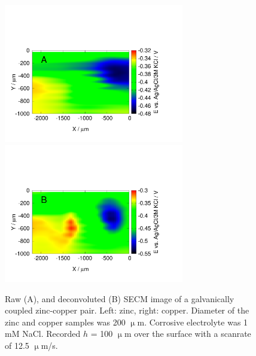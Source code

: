 \begin{figure}
\centering
\includegraphics[trim = 0mm 0mm 30mm 60mm, clip, width=0.7\textwidth]{img/zinc_copper/1.pdf}
\includegraphics[trim = 0mm 0mm 30mm 60mm, clip, width=0.7\textwidth]{img/zinc_copper/1_deconvoluted.pdf}

\caption[Raw, and deconvoluted SECM image of a galvanically coupled zinc-copper pair.]{Raw (A), and deconvoluted (B) SECM image of a galvanically coupled zinc-copper pair.
Left: zinc, right: copper.
Diameter of the zinc and copper samples was 200 $\upmu$m.
Corrosive electrolyte was 1 mM NaCl.
Recorded $h$ = 100 $\upmu$m over the surface with a scanrate of 12.5 $\upmu$m/s.}
\label{fig:zinc_copper}
\end{figure}

